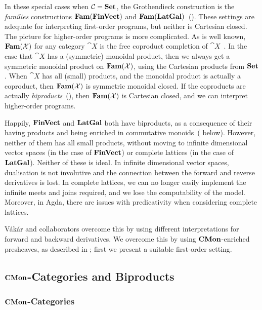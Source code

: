 In these special cases when $\mathcal{C} = \mathbf{Set}$, the Grothendieck construction is the {\em families} constructions $\mathbf{Fam}(\mathbf{FinVect})$ and $\mathbf{Fam}(\mathbf{LatGal})$~(). These settings are adequate for interpreting first-order programs, but neither is Cartesian closed. The picture for higher-order programs is more complicated. As is well known, $\mathbf{Fam}(\mathcal{X})$ for any category $\cat{X}$ is the free coproduct completion of $\cat{X}$~\cite{lawvere63}. In the case that $\cat{X}$ has a (symmetric) monoidal product, then we always get a symmetric monoidal product on $\mathbf{Fam}(\mathcal{X})$, using the Cartesian products from $\mathbf{Set}$. When $\cat{X}$ has all (small) products, and the monoidal product is actually a coproduct, then $\mathbf{Fam}(\mathcal{X})$ is symmetric monoidal closed. If the coproducts are actually {\em biproducts}~(), then $\mathbf{Fam}(\mathcal{X})$ is Cartesian closed, and we can interpret higher-order programs.

Happily, $\mathbf{FinVect}$ and $\mathbf{LatGal}$ both have biproducts, as a consequence of their having products and being enriched in commutative monoids~( below). However, neither of them has all small products, without moving to infinite dimensional vector spaces (in the case of $\mathbf{FinVect}$) or complete lattices (in the case of $\mathbf{LatGal}$). Neither of these is ideal. In infinite dimensional vector spaces, dualisation is not involutive and the connection between the forward and reverse derivatives is lost. In complete lattices, we can no longer easily implement the infinite meets and joins required, and we lose the computability of the model. Moreover, in Agda, there are issues with predicativity when considering complete lattices. 

Vákár and collaborators overcome this by using different interpretations for forward and backward derivatives. We overcome this by using $\mathbf{CMon}$-enriched presheaves, as described in ; first we present a suitable first-order setting.

\subsection{$\mathbf{CMon}$-Categories and Biproducts}
\label{sec:biproducts}

\subsubsection{$\mathbf{CMon}$-Categories}

